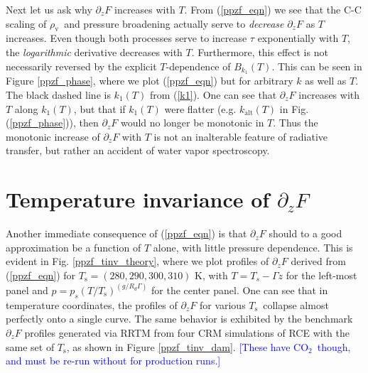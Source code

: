 \documentclass[10pt]{article}
\newcommand{\comment}[1]{\textcolor{blue}{[{#1}]}}
\newcommand{\eqnref}[1]{(\ref{#1})}
\newcommand{\ppz}{\ensuremath{\partial_z}}
\newcommand{\cotwo}{\ensuremath{\mathrm{CO_2}}}
\newcommand{\FLW}{\ensuremath{F}}
\newcommand{\rhov}{\ensuremath{\rho_\mathrm{v}}}
\newcommand{\Ts}{\ensuremath{T_\mathrm{s}}}
\newcommand{\ps}{\ensuremath{p_s}}
\begin{document}
Next let us ask why $\ppz F$ increases with $T$. From \eqnref{ppzf_eqn} we see that the C-C scaling of \rhov\ and pressure broadening actually serve to \emph{decrease} $\ppz F$ as $T$ increases. Even though both processes serve to increase $\tau$ exponentially with $T$, the \emph{logarithmic} derivative decreases with $T$. Furthermore, this effect is not necessarily  reversed by the explicit $T$-dependence of $B_{k_1}(T)$. This can be seen in Figure \ref{ppzf_phase}, where we plot \eqnref{ppzf_eqn} but for arbitrary $k$ as well as $T$. The black dashed line is  $k_1(T)$ from \eqnref{k1}. One can see that $\ppz F$ increases with $T$ along  $k_1(T)$, but that if $k_1(T)$ were flatter (e.g. $k_{\mathrm{alt}}(T)$ in Fig. \eqnref{ppzf_phase}), then $\ppz F$ would no longer be monotonic in $T$. Thus the monotonic increase of $\ppz F$ with $T$ is not an inalterable feature of radiative transfer, but rather an accident of water vapor spectroscopy.

\section{Temperature invariance of  $\ppz \FLW$} 
Another immediate consequence of \eqnref{ppzf_eqn} is that $\ppz F$ should to a good approximation be a function of $T$ alone, with little pressure dependence. This is evident in Fig. \ref{ppzf_tinv_theory}, where we plot profiles of $\ppz F$ derived from \eqnref{ppzf_eqn} for $\Ts=(280,290,300,310)$ K, with $T=T_s-\Gamma z$ for the left-most panel and $p=\ps(T/\Ts)^{(g/R_d\Gamma)}$ for the center panel. One can see that in temperature coordinates, the profiles of $\ppz F$ for various \Ts\ collapse almost perfectly onto a single curve. The same behavior is exhibited by the benchmark $\ppz F$ profiles generated via RRTM from four CRM simulations of RCE with the same set of \Ts, as shown in Figure \ref{ppzf_tinv_dam}. \comment{These have \cotwo\ though, and must be re-run without for production runs.}
\end{document}
